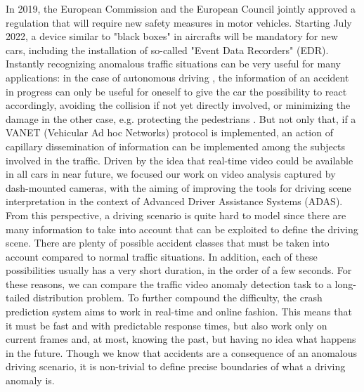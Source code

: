 In 2019, the European Commission and the European Council jointly approved a regulation that will require new safety measures in motor vehicles.
Starting July 2022, a device similar to "black boxes" in aircrafts will be mandatory for new cars, including the installation of so-called "Event Data Recorders" (EDR).
Instantly recognizing anomalous traffic situations can be very useful for many applications:
in the case of autonomous driving \cite{codevilla2019exploring}, the information of an accident in progress can only be useful for oneself to give the car the possibility to react accordingly, avoiding the collision if not yet directly involved, or minimizing the damage in the other case, e.g. protecting the pedestrians \cite{4298901}.
But not only that, if a VANET (Vehicular Ad hoc Networks) protocol \cite{fatemidokht2021efficient} is implemented, an action of capillary dissemination of information can be implemented among the subjects involved in the traffic.
Driven by the idea that real-time video could be available in all cars in near future, we focused our work on video analysis captured by dash-mounted cameras, with the aiming of improving the tools for driving scene interpretation in the context of Advanced Driver Assistance Systems (ADAS).
From this perspective, a driving scenario is quite hard to model since there are many information to take into account that can be exploited to define the driving scene.
There are plenty of possible accident classes that must be taken into account compared to normal traffic situations.
In addition, each of these possibilities usually has a very short duration, in the order of a few seconds.
For these reasons, we can compare the traffic video anomaly detection task to a long-tailed distribution problem.
To further compound the difficulty, the crash prediction system aims to work in real-time and online fashion.
This means that it must be fast and with predictable response times, but also work only on current frames and, at most, knowing the past, but having no idea what happens in the future.
Though we know that accidents are a consequence of an anomalous driving scenario, it is non-trivial to define precise boundaries of what a driving anomaly is.
